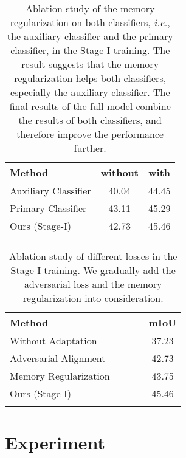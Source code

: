 \documentclass{article}
\def\ie{\emph{i.e.}}
\begin{document}
\begin{table}[tbp]
\small
\begin{center}
{
\setlength{\tabcolsep}{10pt}
\begin{tabular}{l|c|c}
\shline
Method & without  & with  \\
\hline
Auxiliary Classifier & 40.04  &  44.45\\
Primary Classifier  & 43.11  &  45.29 \\
\hline
Ours (Stage-I) & 42.73 & 45.46 \\
\shline
\end{tabular}}
\end{center}
\vspace{-2.5mm}
\caption{Ablation study of the memory regularization on both classifiers, \ie, the auxiliary classifier and the primary classifier, in the Stage-I training. The result suggests that the memory regularization helps both classifiers, especially the auxiliary classifier. The final results of the full model combine the results of both classifiers, and therefore improve the performance further.}\label{table:classifier}
\end{table}

\begin{table}[tbp]
\small
\begin{center}
{
\setlength{\tabcolsep}{7pt}
\begin{tabular}{l|c|c|c|c}
\shline
Method &  &  &  & mIoU \\
\hline
Without Adaptation &  & & & 37.23\\
Adversarial Alignment  &  &  & & 42.73 \\
Memory Regularization &  &  &  & 43.75 \\
Ours (Stage-I)  &  &  &  & 45.46 \\
\shline
\end{tabular}}
\end{center}
\vspace{-2.5mm}
\caption{Ablation study of different losses in the Stage-I training. We gradually add the adversarial loss  and the memory regularization  into consideration.} \label{table:stage1}
\end{table}

\section{Experiment}
\end{document}
